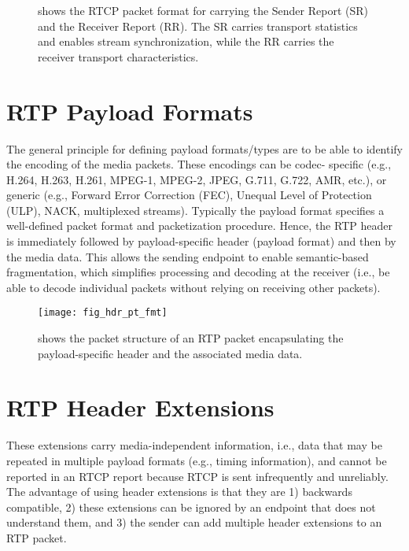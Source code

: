 \begin{figure}[!h]
\caption{shows the RTCP packet format for carrying the Sender Report (SR) and
the Receiver Report (RR). The SR carries transport statistics and enables 
stream synchronization, while the RR carries the receiver transport 
characteristics.}
\label{fig:3:rtcp.hdr}
\end{figure}

\section{RTP Payload Formats}

The general principle for defining payload formats/types are to be able to
identify the encoding of the media packets. These encodings can be codec-
specific (e.g., H.264, H.263, H.261, MPEG-1, MPEG-2, JPEG, G.711, G.722, AMR,
etc.), or generic (e.g., Forward Error Correction (FEC), Unequal Level of
Protection (ULP), NACK, multiplexed streams). Typically the payload format
specifies a well-defined packet format and packetization procedure. Hence, the
RTP header is immediately followed by payload-specific header (payload format)
and then by the media data. This allows the sending endpoint to enable
semantic-based fragmentation, which simplifies processing and decoding at the
receiver (i.e., be able to decode individual packets without relying on
receiving other packets).

\begin{figure}[!h]
\centerline{\texttt{[image: fig\_hdr\_pt\_fmt]}}
\caption{shows the packet structure of an RTP packet encapsulating the
payload-specific header and the associated media data.}
\label{fig:3:pt.fmt}
\end{figure}

\section{RTP Header Extensions}

These extensions carry media-independent information, i.e., data that may be
repeated in multiple payload formats (e.g., timing information), and cannot be
reported in an RTCP report because RTCP is sent infrequently and unreliably.
The advantage of using header extensions is that they are 1) backwards
compatible, 2) these extensions can be ignored by an endpoint that does not
understand them, and 3) the sender can add multiple header extensions to an
RTP packet.

